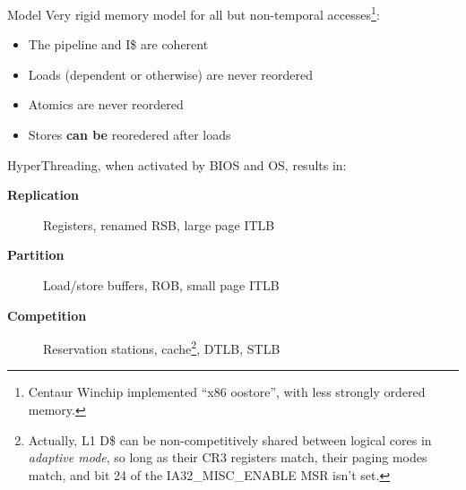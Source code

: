 \documentclass[mathserif,xcolor={dvipsnames,table}]{beamer}
\begin{document}
\begin{frame}{Model}
Very rigid memory model for all but non-temporal accesses\footnote{\tiny{Centaur Winchip implemented ``x86 oostore'', with less strongly ordered memory.}}:
\begin{itemize}
\item The pipeline and I\$ are coherent
\item Loads (dependent or otherwise) are never reordered
\item Atomics are never reordered
\item Stores \textbf{can be} reoredered after loads
\end{itemize}
\vfill
HyperThreading, when activated by BIOS and OS, results in:
\begin{description}
\item[\textbf{Replication}] Registers, renamed RSB, large page ITLB
\item[\textbf{Partition}] Load/store buffers, ROB, small page ITLB
\item[\textbf{Competition}] Reservation stations, cache\footnote{\tiny{Actually, L1 D\$ can be non-competitively shared between logical cores in \textit{adaptive mode}, so long as their CR3 registers match, their paging modes match, and bit 24 of the IA32\_MISC\_ENABLE MSR isn't set.}}, DTLB, STLB 
\end{description}
\end{frame}
\end{document}
